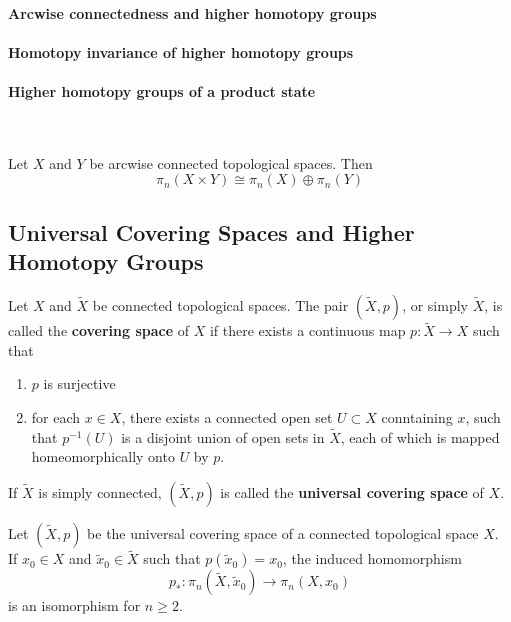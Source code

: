 \documentclass[10pt]{article}
\begin{document}
\paragraph{Arcwise connectedness and higher homotopy groups}

\paragraph{Homotopy invariance of higher homotopy groups}


\paragraph{Higher homotopy groups of a product state}\ 
\begin{proposition}
    Let $X$ and $Y$ be arcwise connected topological spaces.
    Then 
    \begin{equation}
        \pi_n(X\times Y)\cong \pi_n(X)\oplus\pi_n(Y)
    \end{equation}
\end{proposition}

\subsection{Universal Covering Spaces and Higher Homotopy Groups}

\begin{definition}
    Let $X$ and $\widetilde{X}$ be connected topological spaces.
    The pair $(\widetilde{X},p)$, or simply $\widetilde{X}$, is called the \textbf{covering space} of $X$ if there exists a continuous map $p:\widetilde{X}\to X$ such that 
    \begin{enumerate}
        \item $p$ is surjective
        \item for each $x\in X$, there exists a connected open set $U\subset X$ conntaining $x$, such that $p^{-1}(U)$ is a disjoint union of open sets in $\widetilde{X}$, each of which is mapped homeomorphically onto $U$ by $p$.
    \end{enumerate}
    If $\widetilde{X}$ is simply connected, $(\widetilde{X},p)$ is called the \textbf{universal covering space} of $X$.
\end{definition}

\begin{theorem}
    Let $(\widetilde{X},p)$ be the universal covering space of a connected topological space $X$.
    If $x_0\in X$ and $\widetilde{x}_0\in\widetilde{X}$ such that $p(\widetilde{x}_0)=x_0$, the induced homomorphism
    \begin{equation}
        p_\ast:\pi_n\left(\widetilde{X},\widetilde{x}_0\right)\to\pi_n(X,x_0)
    \end{equation}
    is an isomorphism for $n\geq 2$.
\end{theorem}
\end{document}
